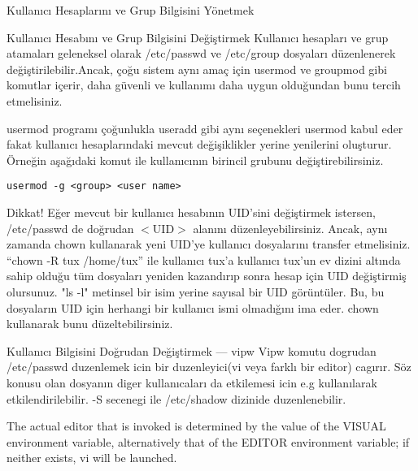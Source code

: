 \begin{section}{Kullanıcı Hesaplarını ve Grup Bilgisini Yönetmek}
\begin{subsection}{Kullanıcı Hesabını ve Grup Bilgisini Değiştirmek}
Kullanıcı hesapları ve grup atamaları geleneksel olarak /etc/passwd ve /etc/group dosyaları düzenlenerek değiştirilebilir.Ancak, çoğu sistem aynı amaç için usermod ve groupmod gibi komutlar içerir, daha güvenli ve kullanımı daha uygun olduğundan bunu tercih etmelisiniz.

usermod programı çoğunlukla useradd gibi aynı seçenekleri usermod kabul eder fakat kullanıcı hesaplarındaki mevcut değişiklikler yerine yenilerini oluşturur. Örneğin aşağıdaki komut ile kullanıcının birincil grubunu değiştirebilirsiniz.
\begin{verbatim}
usermod -g <group> <user name>
\end{verbatim}
Dikkat! Eğer mevcut bir kullanıcı hesabının UID'sini değiştirmek istersen, /etc/passwd de doğrudan $<$UID$>$ alanını düzenleyebilirsiniz. Ancak, aynı zamanda chown kullanarak yeni UID'ye kullanıcı dosyalarını transfer etmelisiniz. “chown -R tux /home/tux” ile kullanıcı tux'a kullanıcı tux'un ev dizini altında sahip olduğu tüm dosyaları yeniden kazandırıp sonra hesap için UID değiştirmiş olursunuz. "ls -l" metinsel bir isim yerine sayısal bir UID görüntüler. Bu, bu dosyaların UID için herhangi bir kullanıcı ismi olmadığını ima eder. chown kullanarak bunu düzeltebilirsiniz.
\end{subsection}
\begin{subsection}{Kullanıcı Bilgisini Doğrudan Değiştirmek --- vipw}
Vipw komutu dogrudan /etc/passwd duzenlemek icin bir duzenleyici(vi veya farklı bir editor) cagırır. Söz konusu olan dosyanın diger kullanıcaları da etkilemesi icin e.g kullanılarak etkilendirilebilir. -S secenegi ile /etc/shadow dizinide duzenlenebilir.

The actual editor that is invoked is determined by the value of the VISUAL
environment variable, alternatively that of the EDITOR environment variable;
if neither exists, vi will be launched.


\end{subsection}
\end{section}
